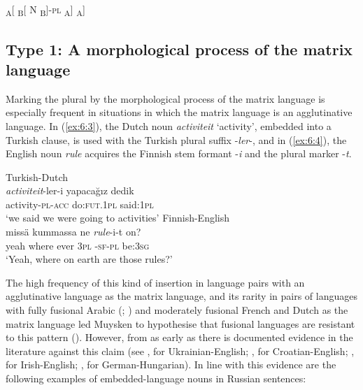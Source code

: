 \ea 
\ea
	\textsubscript{A}[ \textsubscript{B}[ N \textsubscript{B}]-\textsc{pl} \textsubscript{A}]\label{ex:6:2a}
\label{ex:6:2b}
\ex	{\textsubscript{A}[ \textsubscript{B}[ N-\textsc{pl} \textsubscript{B}]-\textsc{pl}}\textsubscript{A}]\label{ex:6:2c}
\z
\z

\subsection{Type 1: A morphological process of the matrix language}

Marking the plural by the morphological process of the matrix language is especially frequent in situations in which the matrix language is an agglutinative language. In (\ref{ex:6:3}), the Dutch noun \textit{activiteit} `activity', embedded into a Turkish clause, is used with the Turkish plural suffix -\textit{ler}-, and in (\ref{ex:6:4}), the English noun \textit{rule} acquires the Finnish stem formant -\textit{i} and the plural marker -\textit{t}. 

\ea
\label{ex:6:3}
Turkish-Dutch \citep[150]{backus-two-1996}\\
\gll \textit{activiteit}-ler-i {yapacağız} {dedik}\\
	activity-\textsc{pl-acc} do:\textsc{fut.1pl} said:\textsc{1pl}\\
\glt `we said we were going to activities'
\ex
\label{ex:6:4}
Finnish-English \citep[60]{halmari-government-1997}\\
 {missä} {kummassa} {ne} \textit{rule}-i-t {on}?\\
	yeah where ever \textsc{3pl} {\phantom{mm}}-\textsc{sf-pl} be:\textsc{3sg}\\
\glt `Yeah, where on earth are those rules?'
\z

\noindent The high frequency of this kind of insertion in language pairs with an agglutinative language as the matrix language, and its rarity in pairs of languages with fully fusional Arabic (\citealt[180]{boumans-syntax-1998}; \citealt[189]{nortier90}) and moderately fusional French and Dutch as the matrix language \citep{treffers-daller-mixing-1994} led Muysken to hypothesise that fusional languages are resistant to this pattern (\citeyear[77]{muysken-bilingual-2000}). However, from as early as \citet[265--266]{hasselmo72} there is documented evidence in the literature against this claim (see \citealt[174]{budzhak-jones98}, for Ukrainian-English; \citealt[73]{hlavac-second-generation-2003}, for Croatian-English; \citealt[180]{stenson-1990}, for Irish-English; \citealt[352]{szabo-language-2010}, for German-Hungarian). In line with this evidence are the following examples of embedded-language nouns in Russian sentences:

